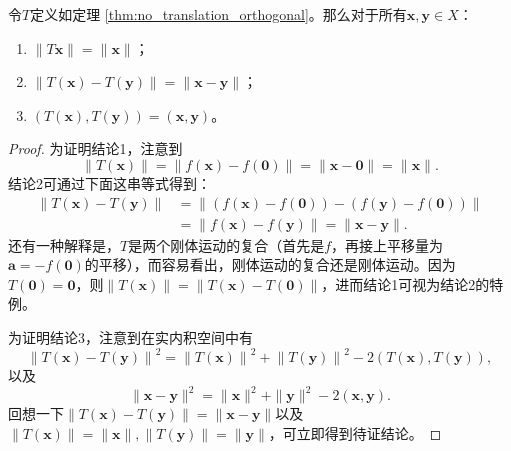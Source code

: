 \begin{lemma}\label{lem:no_translation_property}
    令$T$定义如定理 \ref{thm:no_translation_orthogonal}。那么对于所有$\mathbf{x},\mathbf{y}\in X$：
    \begin{enumerate}
        \item $\|T\mathbf{x}\|=\|\mathbf{x}\|$；
        \item $\|T(\mathbf{x})-T(\mathbf{y})\|=\|\mathbf{x}-\mathbf{y}\|$；
        \item $(T(\mathbf{x}),T(\mathbf{y}))=(\mathbf{x},\mathbf{y})$。
    \end{enumerate}
\end{lemma}
\begin{proof}
    为证明结论1，注意到
    \[\|T(\mathbf{x})\|=\|f(\mathbf{x})-f(\mathbf{0})\|=\|\mathbf{x}-\mathbf{0}\|=\|\mathbf{x}\|.\]
    结论2可通过下面这串等式得到：
    \[\begin{aligned}
        \|T(\mathbf{x})-T(\mathbf{y})\|&=\|(f(\mathbf{x})-f(\mathbf{0}))-(f(\mathbf{y})-f(\mathbf{0}))\|\\&=\|f(\mathbf{x})-f(\mathbf{y})\|=\|\mathbf{x}-\mathbf{y}\|.
    \end{aligned}\]
    还有一种解释是，$T$是两个刚体运动的复合（首先是$f$，再接上平移量为$\mathbf{a}=-f(\mathbf{0})$的平移），而容易看出，刚体运动的复合还是刚体运动。因为$T(\mathbf{0})=\mathbf{0}$，则$\|T(\mathbf{x})\|=\|T(\mathbf{x})-T(\mathbf{0})\|$，进而结论1可视为结论2的特例。

    为证明结论3，注意到在实内积空间中有\[\left\|T(\mathbf{x})-T(\mathbf{y})\right\|^2=\left\|T(\mathbf{x})\right\|^2+\left\|T(\mathbf{y})\right\|^2-2(T(\mathbf{x}),T(\mathbf{y})),\]
    以及\[\|\mathbf{x}-\mathbf{y}\|^2=\|\mathbf{x}\|^2+\|\mathbf{y}\|^2-2(\mathbf{x},\mathbf{y}).\]
    回想一下$\|T(\mathbf{x})-T(\mathbf{y})\|=\|\mathbf{x}-\mathbf{y}\|$以及$\|T(\mathbf{x})\|=\|\mathbf{x}\|,\|T(\mathbf{y})\|=\|\mathbf{y}\|$，可立即得到待证结论。
\end{proof}

